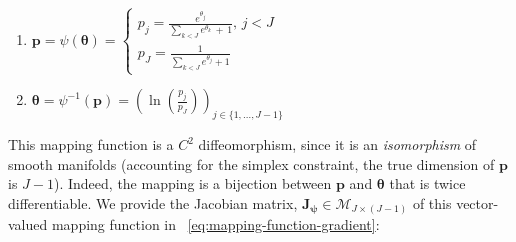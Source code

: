 \documentclass[long, final]{jobim}
\begin{document}
\begin{multicols}{2}
\label{eq:mapping-function}
\begin{enumerate}[label=\emph{\alph*})]
\item $\boldsymbol{p} = \psi (\boldsymbol{\theta}) =
\begin{cases}
p_j =  \frac{e^{\theta_j}}{\sum_{k < J} e^{\theta_k} \, + \, 1}, \, j < J\\
p_J =  \frac{1}{\sum_{k < J} e^{\theta_j} + 1}
\end{cases}$
\item $\boldsymbol{\theta} = \psi^{-1} (\boldsymbol{p}) = \left(\ln{\left( \frac{p_j}{p_J}\right)} \right)_{j \in \{ 1, \ldots, J -1\}}$
\end{enumerate}
\end{multicols}


This mapping function is a $C^2$ diffeomorphism, since it is an \textit{isomorphism} of smooth manifolds (accounting for the simplex constraint, the true dimension of $\boldsymbol{p}$ is $J-1$). Indeed, the mapping is a bijection between $\boldsymbol{p}$ and $\boldsymbol{\theta}$ that is twice differentiable. We provide the Jacobian matrix, $\mathbf{J}_{\boldsymbol{\psi}} \in \mathcal{M}_{J \times (J-1)}$ of this vector-valued mapping function in \equationname~\ref{eq:mapping-function-gradient}:
\end{document}
